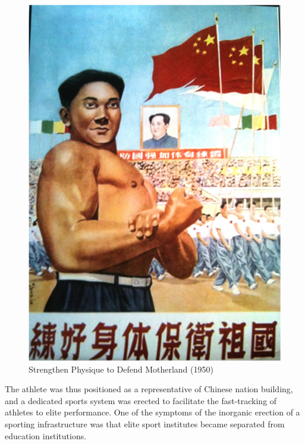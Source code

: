 \begin{CJK}{UTF8}{gbsn}
\begin{figure}[htbp]
  \includegraphics[width = \linewidth,scale=.7]{images/motherlandStrength.png}
  \caption{Strengthen Physique to Defend Motherland (1950)}
  \label{fig:motherlandStrength}
\end{figure}

The athlete was thus positioned as a representative of Chinese nation building, and a dedicated sports system was erected to facilitate the fast-tracking of athletes to elite performance.  One of the symptoms of the inorganic erection of a sporting infrastructure was that elite sport institutes became  separated from education institutions.


\end{CJK}

